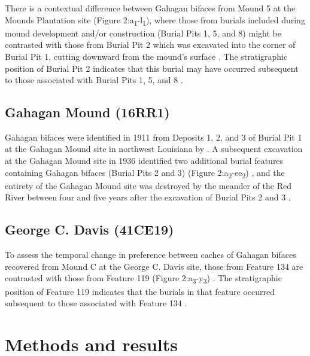 \documentclass[]{interact}
\theoremstyle{plain}%
\theoremstyle{definition}
\theoremstyle{remark}
\begin{document}
There is a contextual difference between Gahagan bifaces from Mound 5 at
the Mounds Plantation site (Figure
2:a\textsubscript{1}-l\textsubscript{1}), where those from burials
included during mound development and/or construction (Burial Pits 1, 5,
and 8) might be contrasted with those from Burial Pit 2 which was
excavated into the corner of Burial Pit 1, cutting downward from the
mound's surface \citep{RN8174}. The stratigraphic position of Burial Pit
2 indicates that this burial may have occurred subsequent to those
associated with Burial Pits 1, 5, and 8 \citep{RN8174}.

\hypertarget{gahagan-mound-16rr1}{%
\subsection{Gahagan Mound (16RR1)}\label{gahagan-mound-16rr1}}

Gahagan bifaces were identified in 1911 from Deposits 1, 2, and 3 of
Burial Pit 1 at the Gahagan Mound site in northwest Louisiana by
\citet[Figures 18-19, 21]{RN7115}. A subsequent excavation at the
Gahagan Mound site in 1936 identified two additional burial features
containing Gahagan bifaces (Burial Pits 2 and 3) (Figure
2:a\textsubscript{2}-ee\textsubscript{2}) \citep[Plate 27]{RN8176}, and
the entirety of the Gahagan Mound site was destroyed by the meander of
the Red River between four and five years after the excavation of Burial
Pits 2 and 3 \citep{RN10759}.

\hypertarget{george-c.-davis-41ce19}{%
\subsection{George C. Davis (41CE19)}\label{george-c.-davis-41ce19}}

To assess the temporal change in preference between caches of Gahagan
bifaces recovered from Mound C at the George C. Davis site, those from
Feature 134 are contrasted with those from Feature 119 (Figure
2:a\textsubscript{3}-y\textsubscript{3}) \citep{RN5746, RN8186}. The
stratigraphic position of Feature 119 indicates that the burials in that
feature occurred subsequent to those associated with Feature 134
\citep{RN5746, RN8186}.

\hypertarget{methods-and-results}{%
\section{Methods and results}\label{methods-and-results}}
\end{document}
